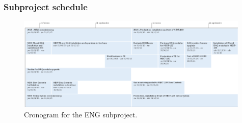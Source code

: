 %
%
%
%
%
%
%
%
\subsubsection*{Subproject schedule}


\begin{figure}[h!]
\begin{center}
\includegraphics[width=0.99\textwidth]{img/ENF_CRONO.pdf}
\end{center}
\caption{\label{Fig:CronoEng} Cronogram for the ENG subproject. }
\end{figure}

